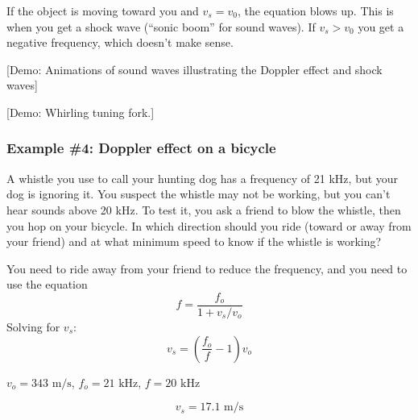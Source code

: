 If the object is moving toward you and $v_s=v_0$, the equation blows up. This is when you get a shock wave (``sonic boom'' for sound waves). If $v_s>v_0$ you get a negative frequency, which doesn't make sense.

[Demo: Animations of sound waves illustrating the Doppler effect and shock waves]

[Demo: Whirling tuning fork.]

\subsubsection{Example \#4: Doppler effect on a bicycle}
A whistle you use to call your hunting dog has a frequency of 21 kHz, but your dog is ignoring it. You suspect the whistle may not be working, but you can’t hear sounds above 20 kHz. To test it, you ask a friend to blow the whistle, then you hop on your bicycle. In which direction should you ride (toward or away from your friend) and at what minimum speed to know if the whistle is working?

You need to ride away from your friend to reduce the frequency, and you need to use the equation
$$f=\frac{f_o}{1+v_s/v_o}$$
Solving for $v_s$:
$$v_s = \left(\frac{f_o}{f}-1\right)v_o$$

$v_o=343\mbox{ m/s}$, $f_o=21\mbox{ kHz}$, $f=20\mbox{ kHz}$

$$v_s=17.1\mbox{ m/s}$$

\clearpage

